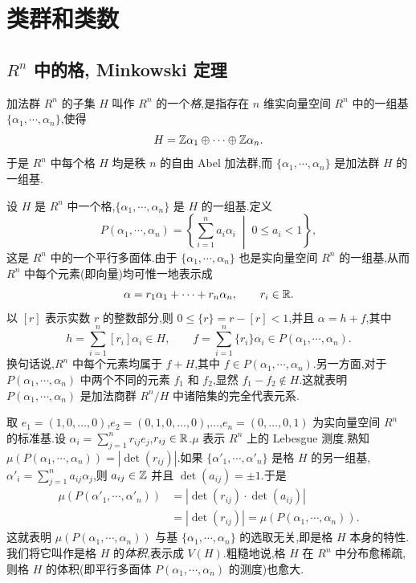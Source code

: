 \section{类群和类数}\label{sec:ch3-s1}

\subsection{\texorpdfstring{$R^n$}{Rn} 中的格, Minkowski 定理}\label{sec:ch3-s1-1}

\begin{definition}\label{def:ch3-1}
加法群 $R^n$ 的子集 $H$ 叫作 $R^n$ 的一个\emph{格},是指存在 $n$ 维实向量空间 $R^n$ 中的一组基 $\{\alpha_1,\cdots,\alpha_n\}$,使得
\[
  H=\mathbb{Z}\alpha_1\oplus\cdots\oplus\mathbb{Z}\alpha_n.
\]
于是 $R^n$ 中每个格 $H$ 均是秩 $n$ 的自由 Abel 加法群,而 $\{\alpha_1,\cdots,\alpha_n\}$ 是加法群 $H$ 的一组基.
\end{definition}

设 $H$ 是 $R^n$ 中一个格,$\{\alpha_1,\cdots,\alpha_n\}$ 是 $H$ 的一组基.定义
\[
  P(\alpha_1,\cdots,\alpha_n)=\left\{\sum_{i=1}^{n}a_i\alpha_i\;\middle|\;0\leqslant a_i<1\right\},
\]
这是 $R^n$ 中的一个平行多面体.由于 $\{\alpha_1,\cdots,\alpha_n\}$ 也是实向量空间 $R^n$ 的一组基,从而 $R^n$ 中每个元素(即向量)均可惟一地表示成
\[
  \alpha=r_1\alpha_1+\cdots+r_n\alpha_n,\qquad r_i\in\mathbb{R}.
\]
以 $[r]$ 表示实数 $r$ 的整数部分,则 $0\leqslant\{r\}=r-[r]<1$,并且 $\alpha=h+f$,其中
\[
  h=\sum_{i=1}^{n}[r_i]\alpha_i\in H,\qquad
  f=\sum_{i=1}^{n}\{r_i\}\alpha_i\in P(\alpha_1,\cdots,\alpha_n).
\]
换句话说,$R^n$ 中每个元素均属于 $f+H$,其中 $f\in P(\alpha_1,\cdots,\alpha_n)$.另一方面,对于 $P(\alpha_1,\cdots,\alpha_n)$ 中两个不同的元素 $f_1$ 和 $f_2$,显然 $f_1-f_2\notin H$.这就表明 $P(\alpha_1,\cdots,\alpha_n)$ 是加法商群 $R^n/H$ 中诸陪集的完全代表元系.

取 $e_1=(1,0,\dots,0)$,$e_2=(0,1,0,\dots,0)$,$\dots$,$e_n=(0,\dots,0,1)$ 为实向量空间 $R^n$ 的标准基.设 $\alpha_i=\sum_{j=1}^{n}r_{ij}e_j$,$r_{ij}\in\mathbb{R}$.$\mu$ 表示 $R^n$ 上的 Lebesgue 测度.熟知 $\mu(P(\alpha_1,\cdots,\alpha_n))=|\det(r_{ij})|$.如果 $\{\alpha'_1,\cdots,\alpha'_n\}$ 是格 $H$ 的另一组基,$\alpha'_i=\sum_{j=1}^{n}a_{ij}\alpha_j$,则 $a_{ij}\in\mathbb{Z}$ 并且 $\det(a_{ij})=\pm1$.于是
\begin{align*}
  \mu(P(\alpha'_1,\cdots,\alpha'_n))
  &=|\det(r_{ij})\cdot\det(a_{ij})|\\
  &=|\det(r_{ij})|=\mu(P(\alpha_1,\cdots,\alpha_n)).
\end{align*}
这就表明 $\mu(P(\alpha_1,\cdots,\alpha_n))$ 与基 $\{\alpha_1,\cdots,\alpha_n\}$ 的选取无关,即是格 $H$ 本身的特性.我们将它叫作是格 $H$ 的\emph{体积},表示成 $V(H)$.粗糙地说,格 $H$ 在 $R^n$ 中分布愈稀疏,则格 $H$ 的体积(即平行多面体 $P(\alpha_1,\cdots,\alpha_n)$ 的测度)也愈大.

